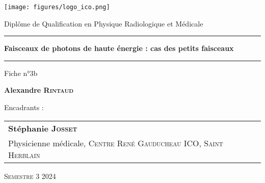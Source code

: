 \begin{titlepage}

    \unitlength 1cm
    \begin{center}
    
    \vspace*{1cm}

    \texttt{[image: figures/logo\_ico.png]}
    
    \vspace{2cm}
    
               {\Large Diplôme de Qualification en Physique Radiologique et Médicale\\}
               
    \vspace{2cm}           
    
    
    \rule{16cm}{0.7pt}
    
    \vspace{12pt}
               
               {\LARGE \bf Faisceaux de photons de haute énergie : cas des petits faisceaux\\}
               
    \vspace{12pt}
    \rule{16cm}{0.7pt}

    \vspace{2cm}

                {\large Fiche n°3b}
    
    \vspace{1.5cm}

               {\Large\bf {Alexandre \textsc{Rintaud}}}
    
    \vspace{1.5cm}
    
    \end{center}
    
    Encadrants :
    
    \small {
    \begin{tabular}{llr}\\
    \textbf{Stéphanie \textsc{Josset}}   &  &  \\
      Physicienne médicale, \textsc{Centre René Gauducheau ICO, Saint Herblain} &    &  \\
    
    \end{tabular}
    }

    \vspace{1.5cm}


    \begin{center}
    \textsc{Semestre 3 2024}
    \end{center}
    
\end{titlepage}
\let\cleardoublepage\clearpage
